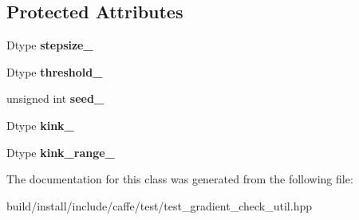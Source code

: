 \subsection*{Protected Attributes}
\begin{DoxyCompactItemize}
\item 
\mbox{\label{classcaffe_1_1_gradient_checker_aaa427369839646baa465b09ead4ba5e7}} 
Dtype {\bfseries stepsize\+\_\+}
\item 
\mbox{\label{classcaffe_1_1_gradient_checker_a2488c7b9f076c4578ba47cea46f8e947}} 
Dtype {\bfseries threshold\+\_\+}
\item 
\mbox{\label{classcaffe_1_1_gradient_checker_a2b5ddbc782ecee24eacf4e567e4bd954}} 
unsigned int {\bfseries seed\+\_\+}
\item 
\mbox{\label{classcaffe_1_1_gradient_checker_af6511d07455bbacdd61e79c33c13fbc9}} 
Dtype {\bfseries kink\+\_\+}
\item 
\mbox{\label{classcaffe_1_1_gradient_checker_a827262b9c3ebcc0f20f9d135541a6c49}} 
Dtype {\bfseries kink\+\_\+range\+\_\+}
\end{DoxyCompactItemize}


The documentation for this class was generated from the following file\+:\begin{DoxyCompactItemize}
\item 
build/install/include/caffe/test/test\+\_\+gradient\+\_\+check\+\_\+util.\+hpp\end{DoxyCompactItemize}
